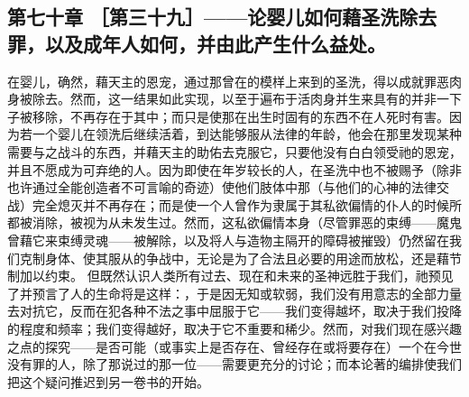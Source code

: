 \subsection{第七十章 ［第三十九］——论婴儿如何藉圣洗除去罪，以及成年人如何，并由此产生什么益处。}

在婴儿，确然，藉天主的恩宠，通过那曾在的模样上来到的圣洗，得以成就罪恶肉身被除去。然而，这一结果如此实现，以至于遍布于活肉身并生来具有的并非一下子被移除，不再存在于其中；而只是使那在出生时固有的东西不在人死时有害。因为若一个婴儿在领洗后继续活着，到达能够服从法律的年龄，他会在那里发现某种需要与之战斗的东西，并藉天主的助佑去克服它，只要他没有白白领受祂的恩宠，并且不愿成为可弃绝的人。因为即使在年岁较长的人，在圣洗中也不被赐予（除非也许通过全能创造者不可言喻的奇迹）使他们肢体中那（与他们的心神的法律交战）完全熄灭并不再存在；而是使一个人曾作为隶属于其私欲偏情的仆人的时候所都被消除，被视为从未发生过。然而，这私欲偏情本身（尽管罪恶的束缚——魔鬼曾藉它来束缚灵魂——被解除，以及将人与造物主隔开的障碍被摧毁）仍然留在我们克制身体、使其服从的争战中，无论是为了合法且必要的用途而放松，还是藉节制加以约束。 但既然认识人类所有过去、现在和未来的圣神远胜于我们，祂预见了并预言了人的生命将是这样：，于是因无知或软弱，我们没有用意志的全部力量去对抗它，反而在犯各种不法之事中屈服于它——我们变得越坏，取决于我们投降的程度和频率；我们变得越好，取决于它不重要和稀少。然而，对我们现在感兴趣之点的探究——是否可能（或事实上是否存在、曾经存在或将要存在）一个在今世没有罪的人，除了那说过的那一位——需要更充分的讨论；而本论著的编排使我们把这个疑问推迟到另一卷书的开始。\par



\section{}

\par

